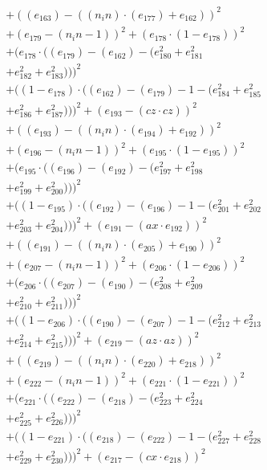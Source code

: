 \documentclass[10pt, a4paper]{article}
\begin{document}
\begin{small}
\begin{align*}
& + ((e_{163}) - ((n_in)  \cdot  (e_{177}) + e_{162}))^{2} \\
& + (e_{179} - (n_in - 1))^{2} + (e_{178}  \cdot  (1 - e_{178}))^{2} \\
& + (e_{178}  \cdot  ((e_{179}) - (e_{162}) - (e_{180}^{2} + e_{181}^{2} \\
& + e_{182}^{2} + e_{183}^{2})))^{2} \\
& + ((1 - e_{178})  \cdot  ((e_{162}) - (e_{179}) - 1 - (e_{184}^{2} + e_{185}^{2} \\
& + e_{186}^{2} + e_{187}^{2})))^{2} + (e_{193} - (cz  \cdot  cz))^{2} \\
& + ((e_{193}) - ((n_in)  \cdot  (e_{194}) + e_{192}))^{2} \\
& + (e_{196} - (n_in - 1))^{2} + (e_{195}  \cdot  (1 - e_{195}))^{2} \\
& + (e_{195}  \cdot  ((e_{196}) - (e_{192}) - (e_{197}^{2} + e_{198}^{2} \\
& + e_{199}^{2} + e_{200}^{2})))^{2} \\
& + ((1 - e_{195})  \cdot  ((e_{192}) - (e_{196}) - 1 - (e_{201}^{2} + e_{202}^{2} \\
& + e_{203}^{2} + e_{204}^{2})))^{2} + (e_{191} - (ax  \cdot  e_{192}))^{2} \\
& + ((e_{191}) - ((n_in)  \cdot  (e_{205}) + e_{190}))^{2} \\
& + (e_{207} - (n_in - 1))^{2} + (e_{206}  \cdot  (1 - e_{206}))^{2} \\
& + (e_{206}  \cdot  ((e_{207}) - (e_{190}) - (e_{208}^{2} + e_{209}^{2} \\
& + e_{210}^{2} + e_{211}^{2})))^{2} \\
& + ((1 - e_{206})  \cdot  ((e_{190}) - (e_{207}) - 1 - (e_{212}^{2} + e_{213}^{2} \\
& + e_{214}^{2} + e_{215}^{2})))^{2} + (e_{219} - (az  \cdot  az))^{2} \\
& + ((e_{219}) - ((n_in)  \cdot  (e_{220}) + e_{218}))^{2} \\
& + (e_{222} - (n_in - 1))^{2} + (e_{221}  \cdot  (1 - e_{221}))^{2} \\
& + (e_{221}  \cdot  ((e_{222}) - (e_{218}) - (e_{223}^{2} + e_{224}^{2} \\
& + e_{225}^{2} + e_{226}^{2})))^{2} \\
& + ((1 - e_{221})  \cdot  ((e_{218}) - (e_{222}) - 1 - (e_{227}^{2} + e_{228}^{2} \\
& + e_{229}^{2} + e_{230}^{2})))^{2} + (e_{217} - (cx  \cdot  e_{218}))^{2} \\

\end{align*}
\end{small}
\end{document}
